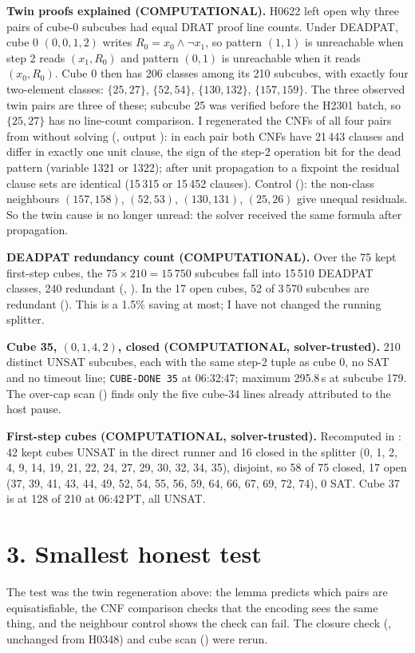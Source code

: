 \documentclass[11pt]{article}
\begin{document}
\textbf{Twin proofs explained (COMPUTATIONAL).} H0622 left open why three pairs of cube-0 subcubes had equal DRAT proof line counts. Under DEADPAT, cube 0 $(0,0,1,2)$ writes $R_0=x_0\wedge\neg x_1$, so pattern $(1,1)$ is unreachable when step 2 reads $(x_1,R_0)$ and pattern $(0,1)$ is unreachable when it reads $(x_0,R_0)$. Cube 0 then has 206 classes among its 210 subcubes, with exactly four two-element classes: $\{25,27\}$, $\{52,54\}$, $\{130,132\}$, $\{157,159\}$. The three observed twin pairs are three of these; subcube 25 was verified before the H2301 batch, so $\{25,27\}$ has no line-count comparison. I regenerated the CNFs of all four pairs from  without solving (, output ): in each pair both CNFs have 21\,443 clauses and differ in exactly one unit clause, the sign of the step-2 operation bit for the dead pattern (variable 1321 or 1322); after unit propagation to a fixpoint the residual clause sets are identical (15\,315 or 15\,452 clauses). Control (): the non-class neighbours $(157,158)$, $(52,53)$, $(130,131)$, $(25,26)$ give unequal residuals. So the twin cause is no longer unread: the solver received the same formula after propagation.

\textbf{DEADPAT redundancy count (COMPUTATIONAL).} Over the 75 kept first-step cubes, the $75\times210=15\,750$ subcubes fall into 15\,510 DEADPAT classes, 240 redundant (, ). In the 17 open cubes, 52 of 3\,570 subcubes are redundant (). This is a 1.5\% saving at most; I have not changed the running splitter.

\textbf{Cube 35, $(0,1,4,2)$, closed (COMPUTATIONAL, solver-trusted).} 210 distinct UNSAT subcubes, each with the same step-2 tuple as cube 0, no SAT and no timeout line; \texttt{CUBE-DONE 35} at 06:32:47; maximum 295.8\,s at subcube 179. The over-cap scan () finds only the five cube-34 lines already attributed to the host pause.

\textbf{First-step cubes (COMPUTATIONAL, solver-trusted).} Recomputed in : 42 kept cubes UNSAT in the direct runner and 16 closed in the splitter (0, 1, 2, 4, 9, 14, 19, 21, 22, 24, 27, 29, 30, 32, 34, 35), disjoint, so 58 of 75 closed, 17 open (37, 39, 41, 43, 44, 49, 52, 54, 55, 56, 59, 64, 66, 67, 69, 72, 74), 0 SAT. Cube 37 is at 128 of 210 at 06:42\,PT, all UNSAT.

\section*{3. Smallest honest test}
The test was the twin regeneration above: the lemma predicts which pairs are equisatisfiable, the CNF comparison checks that the encoding sees the same thing, and the neighbour control shows the check can fail. The closure check (, unchanged from H0348) and cube scan () were rerun.
\end{document}

